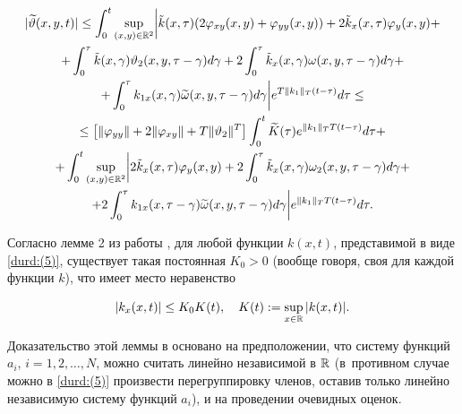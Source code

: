\begin{multline}

\label{durd:(19)}

|\widetilde{\vartheta}(x,y,t)|\leq \int_0^t\sup_{(x,y)\in {\Bbb R}^2}\biggl|\tilde{k}(x,\tau)(2\varphi_{xy}(x,y)+\varphi_{yy}(x,y))+2\tilde{k}_x(x,\tau)\varphi_y(x,y)+

\\

+\int_0^\tau\tilde{k}(x,\gamma)\vartheta_2(x,y,\tau-\gamma)d\gamma+2\int_0^\tau\tilde{k}_x(x,\gamma)\omega(x,y,\tau-\gamma)d\gamma+

\\

+\int_0^\tau k_{1x}(x,\gamma)\widetilde{\omega}(x,y,\tau-\gamma)d\gamma\biggr|e^{T\|k_1\|_T(t-\tau)}d\tau\leq

\\

\leq\left[\|\varphi_{yy}\|+2\|\varphi_{xy}\|+T\|\vartheta_{2}\|^{T}\right]\int^{t}_{0}\widetilde{K}(\tau)e^{\|k_{1}\|_{T}T(t-\tau)}d\tau+

\\

+\int^{t}_{0}\sup_{(x,y)\in {\Bbb R}^2}\biggl|2\tilde{k}_{x}(x,\tau)\varphi_y(x,y)+2\int^{\tau}_{0}\tilde{k}_x(x,\gamma)\omega_2(x,y,\tau-\gamma)d\gamma+

\\

+2\int^{\tau}_{0}

k_{1x}(x,\tau-\gamma)\widetilde{\omega}(x,y,\tau-\gamma)d\gamma\biggr|e^{\|k_{1}\|_{T}T(t-\tau)}d\tau. 

\end{multline}



\pagebreak



Согласно лемме 2 из работы \cite{durd:9},  для любой функции $k(x,t)$, представимой в виде \eqref{durd:(5)}, существует такая постоянная $K_{0}>0$ (вообще говоря, своя для каждой функции $k$), что имеет место неравенство

\begin{equation}

|k_x(x,t)|\leq K_0 K(t), \quad   K(t):=\sup_{x\in {\Bbb R}}|k(x,t)|. 

\label{durd:(20)}

\end{equation}



Доказательство этой леммы  в \cite{durd:14}  основано на  предположении, что систему функций $a_i$, $ i=1, 2, \dots, N$, можно считать линейно независимой в ${\Bbb R}$ (в~противном случае можно в \eqref{durd:(5)} произвести перегруппировку членов, оставив только линейно независимую систему функций $a_i$), и на проведении очевидных оценок.



